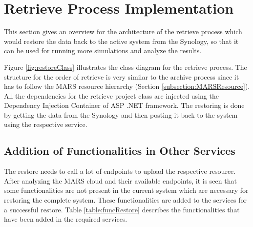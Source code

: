 \section{Retrieve Process Implementation}
This section gives an overview for the architecture of the retrieve process which would restore the data back to the active
system from the Synology, so that it can be used for running more simulations and analyze the results. 

Figure \ref{fig:restoreClass} illustrates the class diagram for the retrieve process. The structure for the order of retrieve is very similar to the archive process
since it has to follow the MARS resource hierarchy (Section \ref{subsection:MARSResource}). All the dependencies for the retrieve project class are injected
using the Dependency Injection Container of ASP .NET framework. The restoring is done by getting the data from the Synology and then posting it back to the system
using the respective service.

\subsection{Addition of Functionalities in Other Services}
The restore needs to call a lot of endpoints to upload the respective resource. After analyzing the MARS cloud and their available endpoints, it is
seen that some functionalities are not present in the current system which are necessary for restoring the complete system. These functionalities are
added to the services for a successful restore. Table \ref{table:funcRestore} describes the functionalities that have been
added in the required services.

